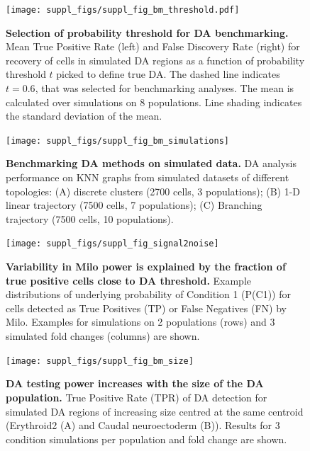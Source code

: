 \documentclass[
]{article}
\begin{document}
\begin{figure}
\centering
\texttt{[image: suppl\_figs/suppl\_fig\_bm\_threshold.pdf]}
\caption{\label{fig:sup-fig-bm-threshold}\textbf{Selection of probability threshold for DA benchmarking.} Mean True Positive Rate (left) and False Discovery Rate (right) for recovery of cells in simulated DA regions as a function of probability threshold \(t\) picked to define true DA. The dashed line indicates \(t = 0.6\), that was selected for benchmarking analyses. The mean is calculated over simulations on 8 populations. Line shading indicates the standard deviation of the mean.}
\end{figure}



\begin{figure}
\texttt{[image: suppl\_figs/suppl\_fig\_bm\_simulations]} \caption{\textbf{Benchmarking DA methods on simulated data.} DA analysis performance on KNN graphs from simulated datasets of different topologies: (A) discrete clusters (2700 cells, 3 populations); (B) 1-D linear trajectory (7500 cells, 7 populations); (C) Branching trajectory (7500 cells, 10 populations).}\label{fig:sup-fig-bm-simulations}
\end{figure}



\begin{figure}
\texttt{[image: suppl\_figs/suppl\_fig\_signal2noise]} \caption{\textbf{Variability in Milo power is explained by the fraction of true positive cells close to DA threshold.} Example distributions of underlying probability of Condition 1 (P(C1)) for cells detected as True Positives (TP) or False Negatives (FN) by Milo. Examples for simulations on 2 populations (rows) and 3 simulated fold changes (columns) are shown.}\label{fig:sup-fig-bm-signal}
\end{figure}



\begin{figure}
\texttt{[image: suppl\_figs/suppl\_fig\_bm\_size]} \caption{\textbf{DA testing power increases with the size of the DA population.} True Positive Rate (TPR) of DA detection for simulated DA regions of increasing size centred at the same centroid (Erythroid2 (A) and Caudal neuroectoderm (B)). Results for 3 condition simulations per population and fold change are shown.}\label{fig:sup-fig-bm-size}
\end{figure}
\end{document}
